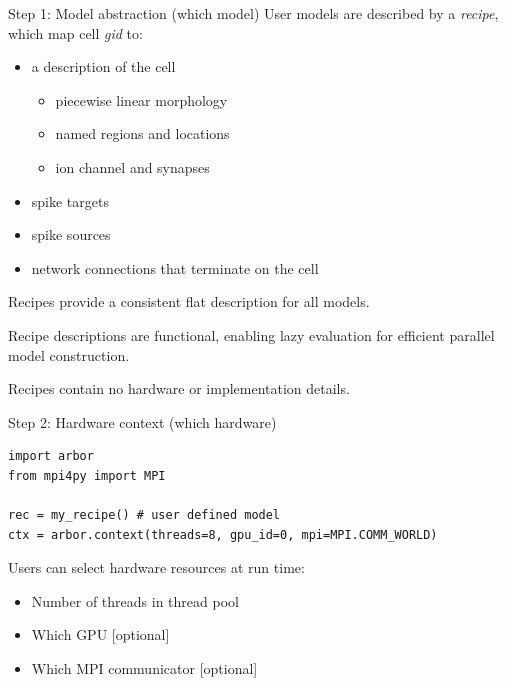 \documentclass[aspectratio=43]{beamer}
\begin{document}
\begin{frame}[fragile]{Step 1: Model abstraction (which model)}
    User models are described by a \emph{recipe}, which map cell \emph{gid} to:
    \begin{itemize}
        \item a description of the cell
        \begin{itemize}
            \item piecewise linear morphology
            \item named regions and locations
            \item ion channel and synapses
        \end{itemize}
        \item spike targets
        \item spike sources
        \item network connections that terminate on the cell
    \end{itemize}
    \vspace{5pt}
    Recipes provide a consistent flat description for all models.

    \vspace{5pt}
    Recipe descriptions are functional, enabling lazy evaluation for efficient parallel model construction.

    \vspace{5pt}
    Recipes contain no hardware or implementation details.
\end{frame}

\begin{frame}[fragile]{Step 2: Hardware context (which hardware)}

        \begin{lstlisting}[style=talkpython]
import arbor
from mpi4py import MPI

rec = my_recipe() # user defined model
ctx = arbor.context(threads=8, gpu_id=0, mpi=MPI.COMM_WORLD)
        \end{lstlisting}


    Users can select hardware resources at run time:
    \begin{itemize}
        \item Number of threads in thread pool
        \item Which GPU [optional]
        \item Which MPI communicator [optional]
    \end{itemize}
\end{frame}
\end{document}
